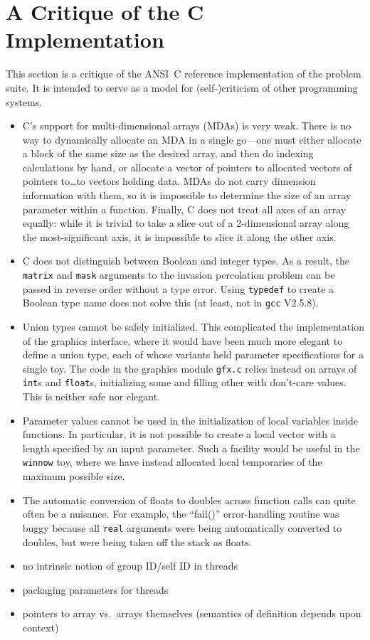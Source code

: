 \section{A Critique of the C Implementation\label{s:critique}}

This section is a critique of the ANSI~C reference implementation of the problem suite.
It is intended to serve as a model for (self-)criticism of other programming systems.

\begin{itemize}
\item	C's support for multi-dimensional arrays (MDAs) is very weak.
	There is no way to dynamically allocate an MDA in a single go---one must either
	allocate a block of the same size as the desired array,
	and then do indexing calculations by hand,
	or allocate a vector of pointers to allocated vectors of pointers to{\ldots}to vectors holding data.
	MDAs do not carry dimension information with them,
	so it is impossible to determine the size of an array parameter within a function.
	Finally,
	C does not treat all axes of an array equally:
	while it is trivial to take a slice out of a 2-dimensional array along the most-significant axis,
	it is impossible to slice it along the other axis.
\item	C does not distinguish between Boolean and integer types.
	As a result,
	the {\tt{matrix}} and {\tt{mask}} arguments to the invasion percolation problem
	can be passed in reverse order without a type error.
	Using {\tt{typedef}} to create a Boolean type name does not solve this
	(at least, not in {\tt{gcc}} V2.5.8).
\item	Union types cannot be safely initialized.
	This complicated the implementation of the graphics interface,
	where it would have been much more elegant to define a union type,
	each of whose variants held parameter specifications for a single toy.
	The code in the graphics module {\tt{gfx.c}} relies instead on arrays of {\tt{int}}s and {\tt{float}}s,
	initializing some and filling other with don't-care values.
	This is neither safe nor elegant.
\item	Parameter values cannot be used in the initialization of local variables inside functions.
	In particular,
	it is not possible to create a local vector with a length specified by an input parameter.
	Such a facility would be useful in the {\tt{winnow}} toy,
	where we have instead allocated local temporaries of the maximum possible size.
\item	The automatic conversion of floats to doubles across function calls can quite often be a nuisance.
	For example, the ``fail()'' error-handling routine was buggy because
	all \verb`real` arguments were being automatically converted to doubles,
	but were being taken off the stack as floats.
\item	no intrinsic notion of group ID/self ID in threads
\item	packaging parameters for threads
\item	pointers to array vs.\ arrays themselves (semantics of definition depends upon context)
\end{itemize}
